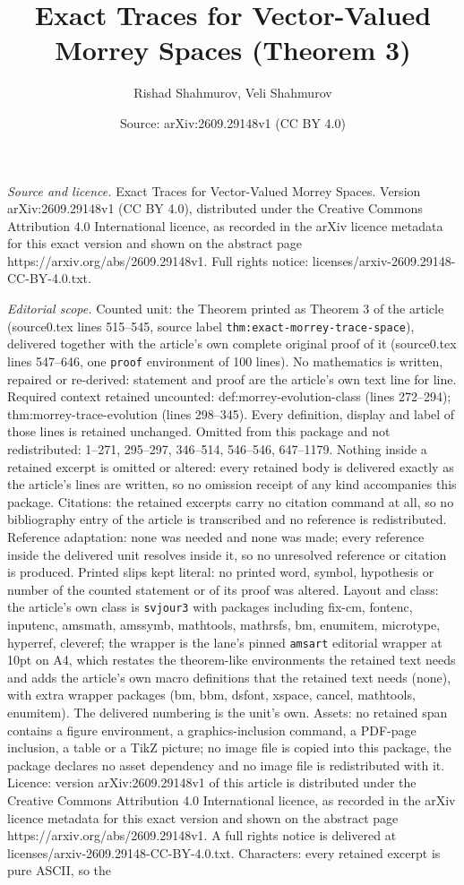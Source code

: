\documentclass[10pt,a4paper]{amsart}
\title[Exact Traces for Vector-Valued Morrey Spaces]{Exact Traces for Vector-Valued Morrey Spaces (Theorem 3)}
\author{Rishad Shahmurov, Veli Shahmurov}
\date{Source: arXiv:2609.29148v1 (CC BY 4.0)}
\begin{document}
\maketitle

\noindent\emph{Source and licence.} Exact Traces for Vector-Valued Morrey Spaces. Version arXiv:2609.29148v1 (CC BY 4.0), distributed under the Creative Commons Attribution 4.0 International licence, as recorded in the arXiv licence metadata for this exact version and shown on the abstract page https://arxiv.org/abs/2609.29148v1. Full rights notice: licenses/arxiv-2609.29148-CC-BY-4.0.txt.\par\smallskip

\noindent\textit{Editorial scope.} Counted unit: the Theorem printed as Theorem 3 of the article (source0.tex lines 515--545, source label \texttt{thm:exact-morrey-trace-space}), delivered together with the article's own complete original proof of it (source0.tex lines 547--646, one \texttt{proof} environment of 100 lines). No mathematics is written, repaired or re-derived: statement and proof are the article's own text line for line. Required context retained uncounted: def:morrey-evolution-class (lines 272--294); thm:morrey-trace-evolution (lines 298--345). Every definition, display and label of those lines is retained unchanged. Omitted from this package and not redistributed: 1--271, 295--297, 346--514, 546--546, 647--1179. Nothing inside a retained excerpt is omitted or altered: every retained body is delivered exactly as the article's lines are written, so no omission receipt of any kind accompanies this package. Citations: the retained excerpts carry no citation command at all, so no bibliography entry of the article is transcribed and no reference is redistributed. Reference adaptation: none was needed and none was made; every reference inside the delivered unit resolves inside it, so no unresolved reference or citation is produced. Printed slips kept literal: no printed word, symbol, hypothesis or number of the counted statement or of its proof was altered. Layout and class: the article's own class is \texttt{svjour3} with packages including fix-cm, fontenc, inputenc, amsmath, amssymb, mathtools, mathrsfs, bm, enumitem, microtype, hyperref, cleveref; the wrapper is the lane's pinned \texttt{amsart} editorial wrapper at 10pt on A4, which restates the theorem-like environments the retained text needs and adds the article's own macro definitions that the retained text needs (none), with extra wrapper packages (bm, bbm, dsfont, xspace, cancel, mathtools, enumitem). The delivered numbering is the unit's own. Assets: no retained span contains a figure environment, a graphics-inclusion command, a PDF-page inclusion, a table or a TikZ picture; no image file is copied into this package, the package declares no asset dependency and no image file is redistributed with it. Licence: version arXiv:2609.29148v1 of this article is distributed under the Creative Commons Attribution 4.0 International licence, as recorded in the arXiv licence metadata for this exact version and shown on the abstract page https://arxiv.org/abs/2609.29148v1. A full rights notice is delivered at licenses/arxiv-2609.29148-CC-BY-4.0.txt. Characters: every retained excerpt is pure ASCII, so the 
\end{document}
